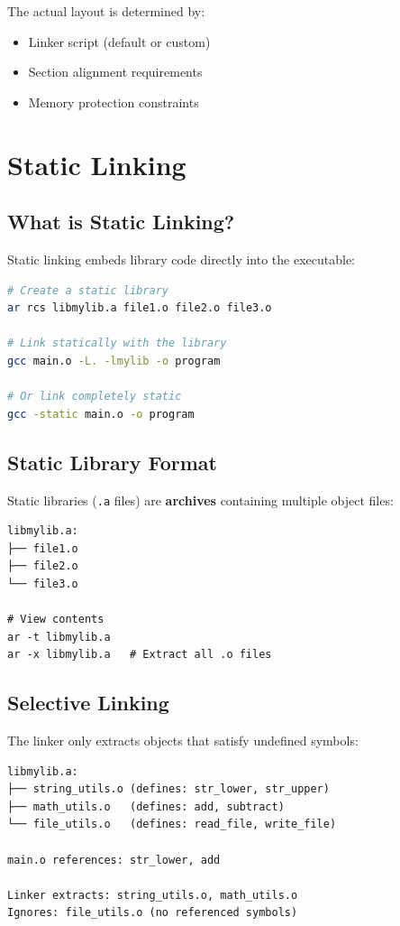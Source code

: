The actual layout is determined by:
\begin{itemize}
    \item Linker script (default or custom)
    \item Section alignment requirements
    \item Memory protection constraints
\end{itemize}

\section{Static Linking}

\subsection{What is Static Linking?}

Static linking embeds library code directly into the executable:

\begin{lstlisting}[language=bash]
# Create a static library
ar rcs libmylib.a file1.o file2.o file3.o

# Link statically with the library
gcc main.o -L. -lmylib -o program

# Or link completely static
gcc -static main.o -o program
\end{lstlisting}

\subsection{Static Library Format}

Static libraries (\texttt{.a} files) are \textbf{archives} containing multiple object files:

\begin{verbatim}
libmylib.a:
├── file1.o
├── file2.o
└── file3.o

# View contents
ar -t libmylib.a
ar -x libmylib.a   # Extract all .o files
\end{verbatim}

\subsection{Selective Linking}

The linker only extracts objects that satisfy undefined symbols:

\begin{verbatim}
libmylib.a:
├── string_utils.o (defines: str_lower, str_upper)
├── math_utils.o   (defines: add, subtract)
└── file_utils.o   (defines: read_file, write_file)

main.o references: str_lower, add

Linker extracts: string_utils.o, math_utils.o
Ignores: file_utils.o (no referenced symbols)
\end{verbatim}

